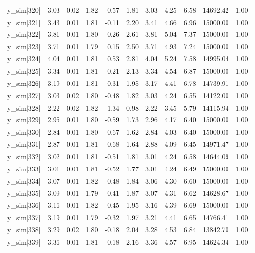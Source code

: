 \begin{table}[ht]
\begin{tabular}{rrrrrrrrrrr}
  y\_sim[320] & 3.03 & 0.02 & 1.82 & -0.57 & 1.81 & 3.03 & 4.25 & 6.58 & 14692.42 & 1.00 \\ 
  y\_sim[321] & 3.43 & 0.01 & 1.81 & -0.11 & 2.20 & 3.41 & 4.66 & 6.96 & 15000.00 & 1.00 \\ 
  y\_sim[322] & 3.81 & 0.01 & 1.80 & 0.26 & 2.61 & 3.81 & 5.04 & 7.37 & 15000.00 & 1.00 \\ 
  y\_sim[323] & 3.71 & 0.01 & 1.79 & 0.15 & 2.50 & 3.71 & 4.93 & 7.24 & 15000.00 & 1.00 \\ 
  y\_sim[324] & 4.04 & 0.01 & 1.81 & 0.53 & 2.81 & 4.04 & 5.24 & 7.58 & 14995.04 & 1.00 \\ 
  y\_sim[325] & 3.34 & 0.01 & 1.81 & -0.21 & 2.13 & 3.34 & 4.54 & 6.87 & 15000.00 & 1.00 \\ 
  y\_sim[326] & 3.19 & 0.01 & 1.81 & -0.31 & 1.95 & 3.17 & 4.41 & 6.78 & 14739.91 & 1.00 \\ 
  y\_sim[327] & 3.03 & 0.02 & 1.80 & -0.48 & 1.82 & 3.03 & 4.24 & 6.55 & 14122.00 & 1.00 \\ 
  y\_sim[328] & 2.22 & 0.02 & 1.82 & -1.34 & 0.98 & 2.22 & 3.45 & 5.79 & 14115.94 & 1.00 \\ 
  y\_sim[329] & 2.95 & 0.01 & 1.80 & -0.59 & 1.73 & 2.96 & 4.17 & 6.40 & 15000.00 & 1.00 \\ 
  y\_sim[330] & 2.84 & 0.01 & 1.80 & -0.67 & 1.62 & 2.84 & 4.03 & 6.40 & 15000.00 & 1.00 \\ 
  y\_sim[331] & 2.87 & 0.01 & 1.81 & -0.68 & 1.64 & 2.88 & 4.09 & 6.45 & 14971.47 & 1.00 \\ 
  y\_sim[332] & 3.02 & 0.01 & 1.81 & -0.51 & 1.81 & 3.01 & 4.24 & 6.58 & 14644.09 & 1.00 \\ 
  y\_sim[333] & 3.01 & 0.01 & 1.81 & -0.52 & 1.77 & 3.01 & 4.24 & 6.49 & 15000.00 & 1.00 \\ 
  y\_sim[334] & 3.07 & 0.01 & 1.82 & -0.48 & 1.84 & 3.06 & 4.30 & 6.60 & 15000.00 & 1.00 \\ 
  y\_sim[335] & 3.09 & 0.01 & 1.79 & -0.41 & 1.87 & 3.07 & 4.31 & 6.62 & 14628.67 & 1.00 \\ 
  y\_sim[336] & 3.16 & 0.01 & 1.82 & -0.45 & 1.95 & 3.16 & 4.39 & 6.69 & 15000.00 & 1.00 \\ 
  y\_sim[337] & 3.19 & 0.01 & 1.79 & -0.32 & 1.97 & 3.21 & 4.41 & 6.65 & 14766.41 & 1.00 \\ 
  y\_sim[338] & 3.29 & 0.02 & 1.80 & -0.18 & 2.04 & 3.28 & 4.53 & 6.84 & 13842.70 & 1.00 \\ 
  y\_sim[339] & 3.36 & 0.01 & 1.81 & -0.18 & 2.16 & 3.36 & 4.57 & 6.95 & 14624.34 & 1.00 \\ 

\end{tabular}
\end{table}
